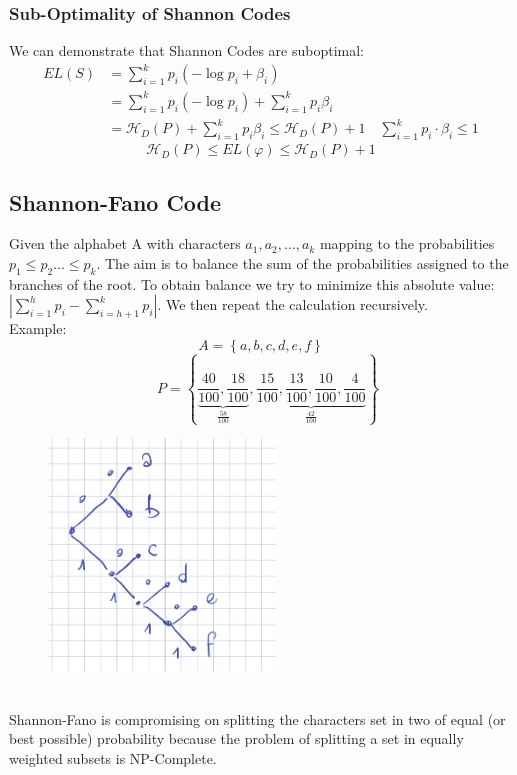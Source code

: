     \subsubsection*{Sub-Optimality of Shannon Codes}
    We can demonstrate that Shannon Codes are suboptimal:
    \begin{align*}
        EL(S) &= \sum_{i=1}^{k}{p_i (-\log{p_i}+\beta_i)}\\
        &=\sum_{i=1}^{k}{p_i (-\log{p_i})} + \sum_{i=1}^{k}{p_i \beta_i}\\
        &=\mathcal{H}_D(P) + \sum_{i=1}^{k}{p_i\beta_i}\leq \mathcal{H}_D(P)+1 \quad \sum_{i=1}^{k}{p_i\cdot\beta_i} \leq1
    \end{align*}
    $$\mathcal{H}_D(P) \leq EL(\varphi) \leq \mathcal{H}_D(P)+1$$
    



    \subsection*{Shannon-Fano Code}
    Given the alphabet A with characters $a_1, a_2, \ldots, a_k $ mapping to the probabilities $ p_1\leq p_2\ldots \leq p_k$. The aim is to balance the sum of the probabilities assigned to the branches of the root. To obtain balance we try to minimize this absolute value: $|\sum_{i=1}^{h}{p_i}- \sum_{i=h+1}^{k}{p_i}|$. We then repeat the calculation recursively.\\
    Example: 
    $$A= \left\{ a,b,c,d,e,f \right\}$$
    $$\quad P=\left\{ \underbrace{\frac{40}{100}, \frac{18}{100}}_{\frac{58}{100}}, \underbrace{\frac{15}{100}, \frac{13}{100}, \frac{10}{100}, \frac{4}{100}}_{\frac{42}{100}} \right\}$$
    \begin{figure}[htbp]
        \centering
        \includegraphics[width = 6cm]{Information Theory/Data Compression/ShannonFano-Tree.png}
    \end{figure}\\
    Shannon-Fano is compromising on splitting the characters set in two of equal (or best possible) probability because the problem of splitting a set in equally weighted subsets is NP-Complete.\newline



